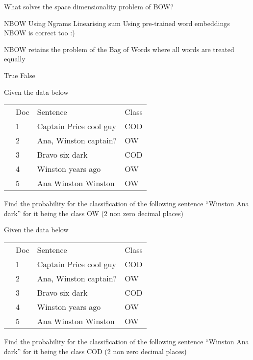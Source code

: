 \documentclass[theme=sleek, randomorder, hidesidemenu]{webquiz}
\begin{document}
\begin{question}

  What solves the space dimensionality problem of BOW?

  \begin{choice}[columns=2, multiple]
    \correct NBOW
    \incorrect Using Ngrams
    \incorrect Linearising sum
    \correct Using pre-trained word embeddings \feedback NBOW is correct too :)
  \end{choice}

\end{question}

\begin{question}

  NBOW retains the problem of the Bag of Words where all words are treated equally

  \begin{choice}[columns=2]
    \incorrect True
    \correct False
  \end{choice}

\end{question}

\begin{question}
Given the data below
\begin{table}[]
\begin{tabular}{llll}
 & Doc & Sentence                           & Class \\
 & 1   & Captain Price  cool guy            & COD   \\
 & 2   & Ana, Winston  captain?             & OW    \\
 & 3   & Bravo six dark                       & COD   \\
 & 4   & Winston years ago                  & OW    \\
 & 5   & Ana Winston Winston                & OW
\end{tabular}
\end{table}
Find the probability for the classification of the following sentence ``Winston Ana dark'' for it being the class OW (2 non zero decimal places)
\end{question}


\begin{question}
Given the data below
\begin{table}[]
\begin{tabular}{llll}
 & Doc & Sentence                           & Class \\
 & 1   & Captain Price  cool guy            & COD   \\
 & 2   & Ana, Winston  captain?             & OW    \\
 & 3   & Bravo six dark                       & COD   \\
 & 4   & Winston years ago                  & OW    \\
 & 5   & Ana Winston Winston                & OW
\end{tabular}
\end{table}
Find the probability for the classification of the following sentence ``Winston Ana dark'' for it being the class COD (2 non zero decimal places)
\end{question}
\end{document}
